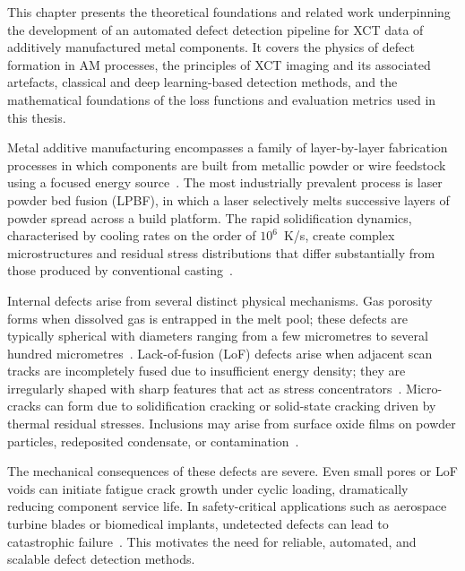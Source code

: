 
This chapter presents the theoretical foundations and related work underpinning the development of
an automated defect detection pipeline for XCT data of additively manufactured metal components. It
covers the physics of defect formation in AM processes, the principles of XCT imaging and its
associated artefacts, classical and deep learning-based detection methods, and the mathematical
foundations of the loss functions and evaluation metrics used in this thesis.

Metal additive manufacturing encompasses a family of layer-by-layer fabrication processes in which
components are built from metallic powder or wire feedstock using a focused energy
source~\citep{Smith2022}. The most industrially prevalent process is laser powder bed fusion (LPBF),
in which a laser selectively melts successive layers of powder spread across a build platform. The
rapid solidification dynamics, characterised by cooling rates on the order of $10^{6}$~K/s, create
complex microstructures and residual stress distributions that differ substantially from those
produced by conventional casting~\citep{Zhang2021}.

Internal defects arise from several distinct physical mechanisms. Gas porosity forms when dissolved
gas is entrapped in the melt pool; these defects are typically spherical with diameters ranging from
a few micrometres to several hundred micrometres~\citep{Zhang2021}. Lack-of-fusion (LoF) defects
arise when adjacent scan tracks are incompletely fused due to insufficient energy density; they are
irregularly shaped with sharp features that act as stress concentrators~\citep{Smith2022}.
Micro-cracks can form due to solidification cracking or solid-state cracking driven by thermal
residual stresses. Inclusions may arise from surface oxide films on powder particles, redeposited
condensate, or contamination~\citep{Deshpande2024}.

The mechanical consequences of these defects are severe. Even small pores or LoF voids can initiate
fatigue crack growth under cyclic loading, dramatically reducing component service life. In
safety-critical applications such as aerospace turbine blades or biomedical implants, undetected
defects can lead to catastrophic failure~\citep{Zubayer2023}. This motivates the need for reliable,
automated, and scalable defect detection methods.


